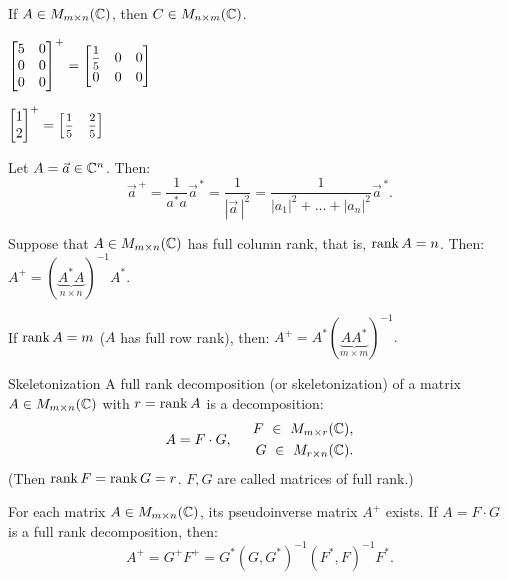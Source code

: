     \begin{note}{}{}
        If $A \in M_{m\times n} (\mathbb{C})$, then $C \in M_{n\times m}(\mathbb{C})$.
    \end{note}
    \begin{multicols}{2}
    \raggedcolumns
    \Ex $\begin{bmatrix}
        5 & 0 \\
        0 & 0 \\
        0 & 0
    \end{bmatrix}^+ = \displaystyle\begin{bmatrix}
        \medmath{\frac{1}{5}} & 0 & 0\\
        0 & 0 & 0
    \end{bmatrix}$

    \Ex $\begin{bmatrix}
        1 \\ 2
    \end{bmatrix}^+ = \begin{bmatrix}
        \medmath{\frac{1}{5}} & \medmath{\frac{2}{5}}
    \end{bmatrix}$
    \end{multicols}
    \Ex Let $A = \vec{a} \in \mathbb{C}^n$. Then: \[\vec{a}^{\, +} = \dfrac{1}{a^*a}\vec{a}^{\, *} = \dfrac{1}{|\vec{a}\,|^2} = \dfrac{1}{|a_1|^2 + \ldots + |a_n|^2} \vec{a}^{\, *}.\]
    \begin{proposition}{}{}
        Suppose that $A \in M_{m\times n}(\mathbb{C})$ has full column rank, that is, $\operatorname{rank} A = n$. Then:
        $A^+ = (\underbrace{A^*A}_{n\times n})^{-1}A^*.$
    \end{proposition}
    \begin{proposition}{}{}
        If $\operatorname{rank} A = m$ ($A$ has full row rank), then: $A^+ = A^* (\underbrace{AA^*}_{m\times m})^{-1}.$
    \end{proposition}
    
    \begin{definition}{Skeletonization}{}
        A full rank decomposition (or skeletonization) of a matrix $A \in M_{m\times n}(\mathbb{C})$ with $r = \operatorname{rank} A$ is a decomposition:
        \[
            A = F \cdot G, \hspace*{0.5cm} \begin{aligned}
                F\ \in \ M_{m\times r}(\mathbb{C}),\\
                G\ \in \ M_{r\times n}(\mathbb{C}).
            \end{aligned}  
        \]
        (Then $\operatorname{rank} F = \operatorname{rank} G = r$. $F, G$ are called matrices of full rank.)
    \end{definition}
    \begin{theorema}{}{}
        For each matrix $A \in M_{m\times n}(\mathbb{C})$, its pseudoinverse matrix $A^+$ exists. If $A = F \cdot G$ is a full rank decomposition, then:
        \[
            A^+ = G^+F^+ = G^*\left(G,G^*\right)^{-1} \left(F^*, F\right)^{-1}F^*. 
        \]
    \end{theorema}
